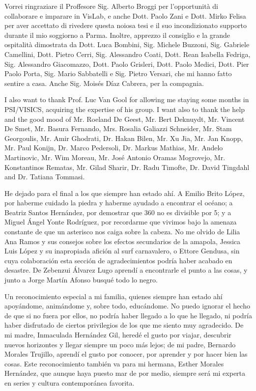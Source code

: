 Vorrei ringraziare il Proffesore Sig. Alberto Broggi per l'opportunità di collaborare e imparare in VisLab, e anche Dott. Paolo Zani e Dott. Mirko Felisa per aver accettato di rivedere questa noiosa tesi e il suo incondizionato supporto durante il mio soggiorno a Parma. Inoltre, apprezzo il consiglio e la grande ospitalità dimostrata da Dott. Luca Bombini, Sig. Michele Buzzoni, Sig. Gabriele Camellini, Dott. Pietro Cerri, Sig. Alessandro Coati, Dott. Rean Isabella Fedriga, Sig. Alessandro Giacomazzo, Dott. Paolo Grisleri, Dott. Paolo Medici, Dott. Pier Paolo Porta, Sig. Mario Sabbatelli e Sig. Pietro Versari, che mi hanno fatto sentire a casa. Anche Sig. Moisés Díaz Cabrera, per la compagnia.

I also want to thank Prof. Luc Van Gool for allowing me staying some months in PSI/VISICS, acquiring the expertise of his group. I want also to thank the help and the good mood of Mr. Roeland De Geest, Mr. Bert Deknuydt, Mr. Vincent De Smet, Mr. Basura Fernando, Mrs. Rosalia Galiazzi Schneider, Mr. Stam Georgoulis, Mr. Amir Ghodrati, Dr. Hakan Bilen, Mr. Xu Jia, Mr. Jan Knopp, Mr. Paul Konijn, Dr. Marco Pedersoli, Dr. Markus Mathias, Mr. Andelo Martinovic, Mr. Wim Moreau, Mr. José Antonio Oramas Mogrovejo, Mr. Konstantinos Rematas, Mr. Gilad Sharir, Dr. Radu Timofte, Dr. David Tingdahl and Dr. Tatiana Tommasi.

He dejado para el final a los que siempre han estado ahí. A Emilio Brito López, por haberme cuidado la piedra y haberme ayudado a encontrar el océano; a Beatriz Santos Hernández, por demostrar que 360 no es divisible por 5; y a Miguel Ángel Yonte Rodríguez, por recordarme que vivimos bajo la amenaza constante de que un asterisco nos caiga sobre la cabeza. No me olvido de Lilia Ana Ramos y sus consejos sobre los efectos secundarios de la amapola, Jessica Luis López y su inapropiada afición al surf carnavalero, o Ettore Gendusa, sin cuya colaboración esta sección de agradecimientos podría haber acabado en desastre. De Zebenzui Álvarez Lugo aprendí a encontrarle el punto a las cosas, y junto a Jorge Martín Afonso busqué todo lo negro.

Un reconocimiento especial a mi familia, quienes siempre han estado ahí apoyándome, animándome y, sobre todo, educándome. No puedo ignorar el hecho de que si no fuera por ellos, no podría haber llegado a lo que he llegado, ni podría haber disfrutado de ciertos privilegios de los que me siento muy agradecido. De mi madre, 
Inmaculada Hernández Gil, heredé el gusto por viajar, descubrir nuevos horizontes y llegar siempre un poco más lejos; de mi padre, Bernardo Morales Trujillo, aprendí el gusto por conocer, por aprender y por hacer bien las cosas. Este reconocimiento también va para mi hermana, Esther Morales Hernández, que aunque haya puesto mar de por medio, siempre será mi experta en series y cultura contemporánea favorita.

